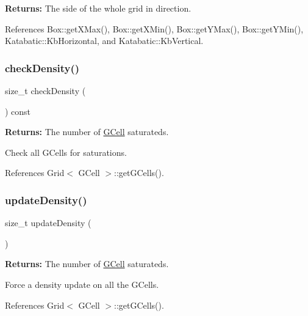 {\bfseries Returns\+:} The side of the whole grid in {\ttfamily direction}. 

References Box\+::get\+X\+Max(), Box\+::get\+X\+Min(), Box\+::get\+Y\+Max(), Box\+::get\+Y\+Min(), Katabatic\+::\+Kb\+Horizontal, and Katabatic\+::\+Kb\+Vertical.

\mbox{\label{classKatabatic_1_1GCellGrid_a88208864ba2268689946a8cb7a86fcb2}} 
\subsubsection{\texorpdfstring{check\+Density()}{checkDensity()}}
{\footnotesize\ttfamily size\+\_\+t check\+Density (\begin{DoxyParamCaption}{ }\end{DoxyParamCaption}) const}

{\bfseries Returns\+:} The number of \mbox{\hyperlink{classKatabatic_1_1GCell}{G\+Cell}} saturateds.

Check all G\+Cells for saturations. 

References Grid$<$ G\+Cell $>$\+::get\+G\+Cells().

\mbox{\label{classKatabatic_1_1GCellGrid_a9b3455dce10eb98d0496175dd586528c}} 
\subsubsection{\texorpdfstring{update\+Density()}{updateDensity()}}
{\footnotesize\ttfamily size\+\_\+t update\+Density (\begin{DoxyParamCaption}{ }\end{DoxyParamCaption})}

{\bfseries Returns\+:} The number of \mbox{\hyperlink{classKatabatic_1_1GCell}{G\+Cell}} saturateds.

Force a density update on all the G\+Cells. 

References Grid$<$ G\+Cell $>$\+::get\+G\+Cells().

\mbox{\label{classKatabatic_1_1GCellGrid_a032d6eb23f92e3a41a020d18c6bbc02d}} 
